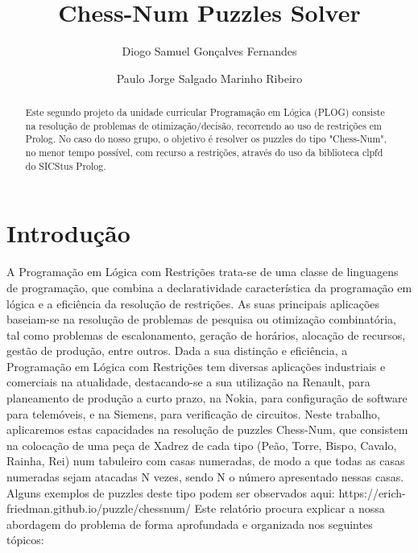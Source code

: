 \documentclass[runningheads]{llncs}
\begin{document}
%
\title{Chess-Num Puzzles Solver}
%
%
\author{Diogo Samuel Gonçalves Fernandes \and
Paulo Jorge Salgado Marinho Ribeiro}
%
%
%
\maketitle              %
%
\begin{abstract}
Este segundo projeto da unidade curricular Programação em Lógica (PLOG) consiste na resolução de problemas
de otimização/decisão, recorrendo ao uso de restrições em Prolog. No caso do nosso grupo, o objetivo é resolver
os puzzles do tipo "Chess-Num", no menor tempo possível, com recurso a restrições, através do uso da biblioteca clpfd do SICStus Prolog.

\end{abstract}

\section{Introdução}
A Programação em Lógica com Restrições trata-se de uma classe de linguagens de programação, que combina a declaratividade característica da programação em lógica
e a eficiência da resolução de restrições. As suas principais aplicações baseiam-se na resolução de problemas de pesquisa ou otimização combinatória, tal como problemas de escalonamento, geração de horários, alocação de recursos, gestão de produção, entre outros.
Dada a sua distinção e eficiência, a Programação em Lógica com Restrições tem diversas aplicações industriais e comerciais na atualidade, destacando-se a sua utilização na Renault, para planeamento de produção a curto prazo, na Nokia, para configuração de software para telemóveis, e na Siemens, para verificação de circuitos.
Neste trabalho, aplicaremos estas capacidades na resolução de puzzles Chess-Num, que consistem na colocação de uma peça de Xadrez de cada tipo (Peão, Torre, Bispo, Cavalo, Rainha, Rei) num tabuleiro com casas numeradas, de modo a que todas as casas numeradas sejam atacadas N vezes, sendo N o número apresentado nessas casas. 
Alguns exemplos de puzzles deste tipo podem ser observados aqui: https://erich-friedman.github.io/puzzle/chessnum/
Este relatório procura explicar a nossa abordagem do problema de forma aprofundada e organizada nos seguintes tópicos:
\end{document}

